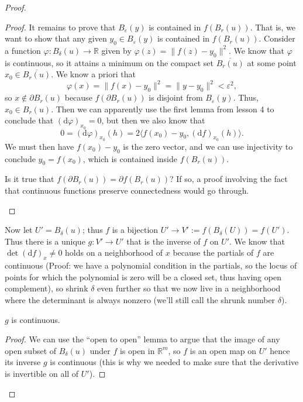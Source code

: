 \documentclass[10pt]{scrartcl}
\providecommand{\ol}{\overline}
\providecommand{\eps}{\varepsilon}
\providecommand{\RR}{\mathbb R}
\begin{document}
\begin{proof}
\begin{proof}
		It remains to prove that $B_\eps(y)$ is contained in $f(B_r(u))$.
		That is, we want to show that any given $y_0\in B_\eps(y)$
		is contained in $f(B_r(u))$.
		Consider a function $\varphi\colon B_\delta(u)\to\RR$ given by
		$\varphi(z) = \|f(z) - y_0\|^2$.
		We know that $\varphi$ is continuous, so it attains a minimum
		on the compact set $\ol{B_r(u)}$ at some point $x_0\in\ol{B_r(u)}$.
		We know a priori that
		\[\varphi(x) = \|f(x) - y_0\|^2 = \|y - y_0\|^2 < \eps^2,\]
		so $x\notin\partial B_r(u)$ because $f(\partial B_r(u))$
		is disjoint from $B_\eps(y)$.
		Thus, $x_0\in B_r(u)$. Then we can apparently use
		the first lemma from lesson 4 to conclude that
		$(\mathrm d\varphi)_{x_0} = 0$, but then we also know that
		\[0 = (\mathrm d\varphi)_{x_0}(h) = 2\langle f(x_0) - y_0,
		(\mathrm df)_{x_0}(h)\rangle.\]
		We must then have $f(x_0) - y_0$ is the zero vector,
		and we can use injectivity to conclude $y_0 = f(x_0)$,
		which is contained inside $f(B_r(u))$.
		\begin{remark*}
			Is it true that $f(\partial B_r(u)) = \partial f(B_r(u))$?
			If so, a proof involving the fact that continuous functions
			preserve connectedness would go through.
		\end{remark*}
	\end{proof}
	
	Now let $U' = B_\delta(u)$; thus $f$ is a bijection
	$U'\to V' := f(B_\delta(U)) = f(U')$. Thus there is a unique
	$g\colon V'\to U'$ that is the inverse of $f$ on $U'$.
	We know that $\det (\mathrm df)_x \ne 0$ holds on a neighborhood of $x$
	because the partials of $f$ are continuous (Proof: we have a
	polynomial condition in the partials, so the locus of points
	for which the polynomial is zero will be a closed set,
	thus having open complement), so shrink $\delta$
	even further so that we now live in a neighborhood
	where the determinant is always nonzero (we'll still call the
	shrunk number $\delta$).
	
	\begin{claim*}
		$g$ is continuous.
	\end{claim*}
	\begin{proof}
		We can use the ``open to open'' lemma to argue that
		the image of any open subset of $B_\delta(u)$ under $f$
		is open in $\RR^m$, so $f$ is an open map on $U'$
		hence its inverse $g$ is continuous (this is why we needed to make sure
		that the derivative is invertible on all of $U'$).
	\end{proof}


\end{proof}
\end{document}
